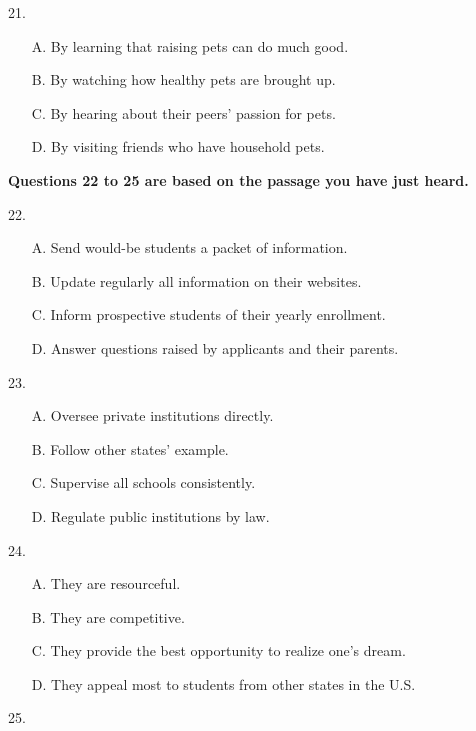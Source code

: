 \documentclass[UTF8,11pt]{ctexart}
\begin{document}
21.


\begin{itemize}[leftmargin=2em,itemsep=.2em,topsep=.4em]\item[A.] By learning that raising pets can do much good.
\item[B.] By watching how healthy pets are brought up.
\item[C.] By hearing about their peers’ passion for pets.
\item[D.] By visiting friends who have household pets.
\end{itemize}

\textbf{Questions 22 to 25 are based on the passage you have just heard.}


22.


\begin{itemize}[leftmargin=2em,itemsep=.2em,topsep=.4em]\item[A.] Send would-be students a packet of information.
\item[B.] Update regularly all information on their websites.
\item[C.] Inform prospective students of their yearly enrollment.
\item[D.] Answer questions raised by applicants and their parents.
\end{itemize}

23.


\begin{itemize}[leftmargin=2em,itemsep=.2em,topsep=.4em]\item[A.] Oversee private institutions directly.
\item[B.] Follow other states’ example.
\item[C.] Supervise all schools consistently.
\item[D.] Regulate public institutions by law.
\end{itemize}

24.


\begin{itemize}[leftmargin=2em,itemsep=.2em,topsep=.4em]\item[A.] They are resourceful.
\item[B.] They are competitive.
\item[C.] They provide the best opportunity to realize one’s dream.
\item[D.] They appeal most to students from other states in the U.S.
\end{itemize}

25.
\end{document}
